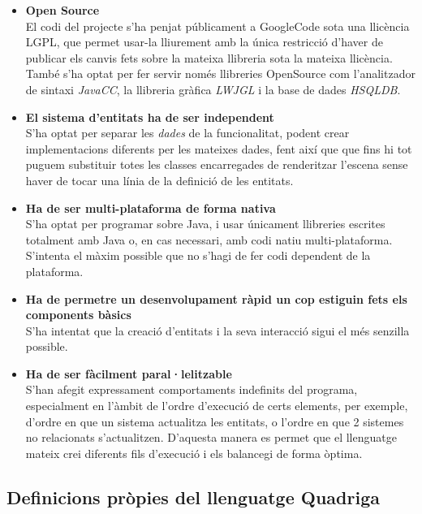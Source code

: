 \begin{itemize}
  \item {\bf Open Source} \hfill \\
    El codi del projecte s'ha penjat públicament a GoogleCode sota una llicència LGPL, que permet usar-la lliurement amb la única restricció d'haver de publicar els canvis fets sobre la mateixa llibreria sota la mateixa llicència. També s'ha optat per fer servir només llibreries OpenSource com l'analitzador de sintaxi {\em JavaCC}, la llibreria gràfica {\em LWJGL} i la base de dades {\em HSQLDB}.
    
  \item {\bf El sistema d'entitats ha de ser independent} \hfill \\
    S'ha optat per separar les {\em dades} de la funcionalitat, podent crear implementacions diferents per les mateixes dades, fent així que que fins hi tot puguem substituir totes les classes encarregades de renderitzar l'escena sense haver de tocar una línia de la definició de les entitats.
    
  \item {\bf Ha de ser multi-plataforma de forma nativa} \hfill \\
    S'ha optat per programar sobre Java, i usar únicament llibreries escrites totalment amb Java o, en cas necessari, amb codi natiu multi-plataforma. S'intenta el màxim possible que no s'hagi de fer codi dependent de la plataforma.
    
  \item {\bf Ha de permetre un desenvolupament ràpid un cop estiguin fets els components bàsics} \hfill \\
    S'ha intentat que la creació d'entitats i la seva interacció sigui el més senzilla possible.
    
  \item {\bf Ha de ser fàcilment paral·lelitzable} \hfill \\
    S'han afegit expressament comportaments indefinits del programa, especialment en l'àmbit de l'ordre d'execució de certs elements, per exemple, d'ordre en que un sistema actualitza les entitats, o l'ordre en que 2 sistemes no relacionats s'actualitzen. D'aquesta manera es permet que el llenguatge mateix crei diferents fils d'execució i els balancegi de forma òptima.
\end{itemize}

\subsection{Definicions pròpies del llenguatge Quadriga}

